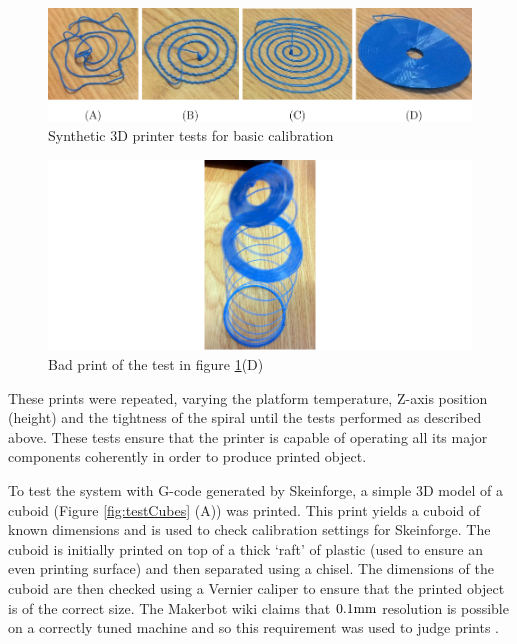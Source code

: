 			\begin{figure}
				\includegraphics[width=1\textwidth]{diagrams/syntheticTests.pdf}
				\caption{Synthetic 3D printer tests for basic calibration}
				\label{fig:syntheticTests}
			\end{figure}
			
			\begin{figure}
				\includegraphics[width=1\textwidth]{diagrams/looseSpiral.pdf}
				\caption{Bad print of the test in figure \ref{fig:syntheticTests}(D)}
				\label{fig:looseSpiral}
			\end{figure}
			
			These prints were repeated, varying the platform temperature, Z-axis
			position (height) and the tightness of the spiral until the tests
			performed as described above. These tests ensure that the printer is
			capable of operating all its major components coherently in order to
			produce printed object.
			
			
			
			To test the system with G-code generated by Skeinforge, a simple 3D model
			of a cuboid (Figure \ref{fig:testCubes} (A)) was printed. This print
			yields a cuboid of known dimensions and is used to check calibration
			settings for Skeinforge. The cuboid is initially printed on top of a thick
			`raft' of plastic (used to ensure an even printing surface) and then
			separated using a chisel. The dimensions of the cuboid are then checked
			using a Vernier caliper to ensure that the printed object is of the
			correct size. The Makerbot wiki claims that $0.1\textrm{mm}$ resolution is
			possible on a correctly tuned machine and so this requirement was used to
			judge prints \cite{makerbotfaq}.
			
